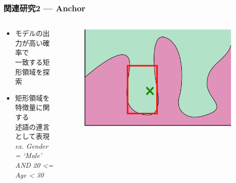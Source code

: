 \documentclass[aspectratio=169]{slide-ja}
\begin{document}
\begin{frame}
  \frametitle{関連研究2 — Anchor}
  \begin{columns}[]
    \begin{column}{0.5\textwidth}
      \begin{itemize}
        \item モデルの出力が高い確率で\\一致する矩形領域を探索
        \item 矩形領域を特徴量に関する\\述語の連言として表現\\
              \textit{\footnotesize{ex. Gender = ‘Male’ AND 20 <= Age < 30}}
      \end{itemize}

      \bigskip
    \end{column}
    \begin{column}{0.5\textwidth}
      \begin{figure}
        \includegraphics[scale=0.35]{visual-anchor}
      \end{figure}
    \end{column}
  \end{columns}
\end{frame}
\end{document}

